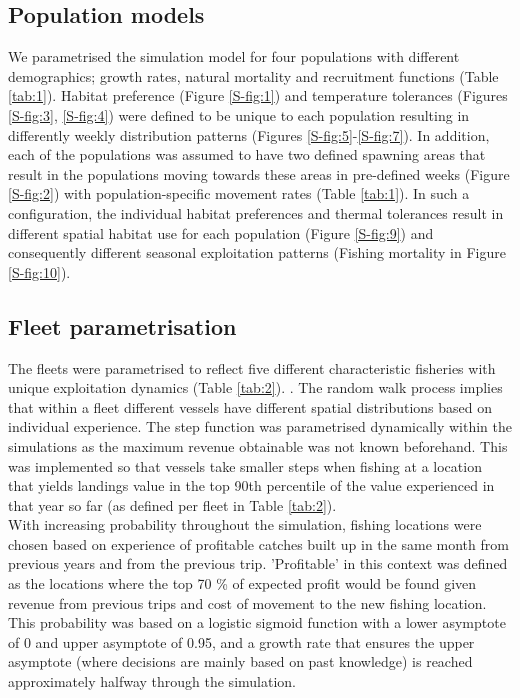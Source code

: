 \documentclass[review]{elsarticle}
\begin{document}
\subsection{Population models}

We parametrised the simulation model for four populations with different
demographics; growth rates, natural mortality and recruitment functions (Table
\ref{tab:1}). Habitat preference (Figure \ref{S-fig:1}) and temperature
tolerances (Figures \ref{S-fig:3}, \ref{S-fig:4}) were defined to be unique to
each population resulting in differently weekly distribution patterns (Figures
\ref{S-fig:5}-\ref{S-fig:7}). In addition, each of the populations was assumed
to have two defined spawning areas that result in the populations moving
towards these areas in pre-defined weeks (Figure \ref{S-fig:2}) with
population-specific movement rates (Table \ref{tab:1}). In such a
configuration, the individual habitat preferences and thermal tolerances result
in different spatial habitat use for each population (Figure \ref{S-fig:9}) and
consequently different seasonal exploitation patterns (Fishing mortality in
Figure \ref{S-fig:10}). 

\subsection{Fleet parametrisation}

The fleets were parametrised to reflect five different characteristic fisheries
with unique exploitation dynamics (Table \ref{tab:2}).  .  The
random walk process implies that within a fleet different vessels have
different spatial distributions based on individual experience. The step
function was parametrised dynamically within the simulations as the maximum
revenue obtainable was not known beforehand. This was implemented so that
vessels take smaller steps when fishing at a location that yields landings
value in the top 90th percentile of the value experienced in that year so far
(as defined per fleet in Table \ref{tab:2}). \\

With increasing probability throughout the simulation, fishing locations were
chosen based on experience of profitable catches built up in the same month
from previous years and from the previous trip. 'Profitable' in this context
was defined as the locations where the top 70 \% of expected profit would be
found given revenue from previous trips and cost of movement to the new fishing
location. This probability was based on a logistic sigmoid function with a
lower asymptote of 0 and upper asymptote of 0.95, and a growth rate that
ensures the upper asymptote (where decisions are mainly based on past
knowledge) is reached approximately halfway through the simulation.  \\
\end{document}

